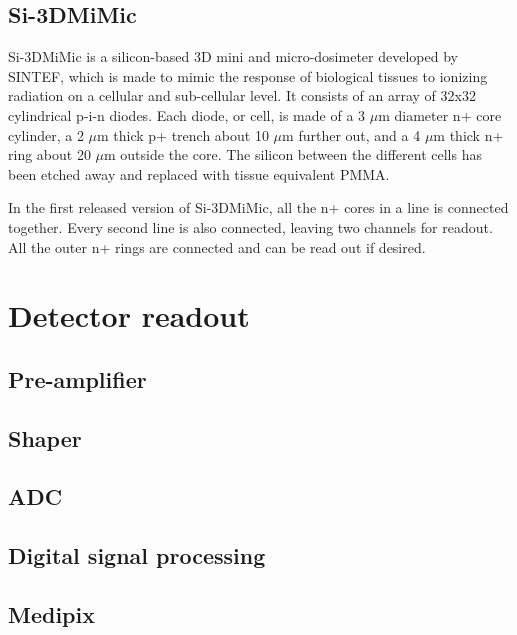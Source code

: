 \documentclass[../main/thesis.tex]{subfiles}
\begin{document}
\subsection{Si-3DMiMic}
\label{t-3d}
Si-3DMiMic is a silicon-based 3D mini and micro-dosimeter developed by SINTEF, which is made to mimic the response of biological tissues to ionizing radiation on a cellular and sub-cellular level. It consists of an array of 32x32 cylindrical p-i-n diodes. Each diode, or cell, is made of a 3 $\mu$m diameter n+ core cylinder, a 2 $\mu$m thick p+ trench about 10 $\mu$m further out, and a 4 $\mu$m thick n+ ring about 20 $\mu$m outside the core. The silicon between the different cells has been etched away and replaced with tissue equivalent \gls{PMMA}. %

In the first released version of Si-3DMiMic, all the n+ cores in a line is connected together. Every second line is also connected, leaving two channels for readout. All the outer n+ rings are connected and can be read out if desired. 

\section{Detector readout}
\label{t-read}

\subsection{Pre-amplifier}
\label{t-amp}

\subsection{Shaper}
\label{t-shaper}

\subsection{ADC}
\label{t-adc}

\subsection{Digital signal processing}
\label{t-dsp}

\subsection{Medipix}
\label{t-medipix}
\end{document}
